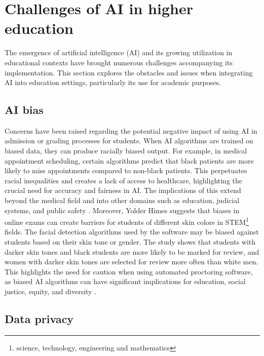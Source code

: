 \section{Challenges of AI in higher education}
The emergence of artificial intelligence (AI) and its growing utilization in educational 
contexts have brought numerous challenges accompanying its implementation.  This section explores the obstacles 
and issues when integrating AI into education settings, particularly its use for academic purposes.
\subsection{AI bias}
Concerns have been raised regarding the potential negative impact of using AI in admission or grading processes for students. 
When AI algorithms are trained on biased data, they can produce racially biased output. For example, in medical appointment 
scheduling, certain algorithms predict that black patients are more likely to miss appointments compared to non-black patients. 
This perpetuates racial inequalities and creates a lack of access to healthcare, highlighting the crucial need for accuracy and 
fairness in AI. The implications of this extend beyond the medical field and into other domains 
such as education, judicial systems, and public safety \citep{shanklin_ethical_2022}. 
 Moreover, Yolder Himes suggests that biases in online exams can create barriers for students of different skin colors in STEM\footnote{science, technology, engineering and mathematics} 
fields.  The facial detection algorithms used by the software may be biased against students based on their skin tone or gender. The study shows 
that students with darker skin tones and black students are more likely to be marked for review, and women with darker skin tones are 
selected for review more often than white men. This highlights the need for caution when using automated proctoring software, as biased 
AI algorithms can have significant implications for education, social justice, equity, and diversity \citep{yoder-himes_racial_2022}. 


\subsection{Data privacy}
